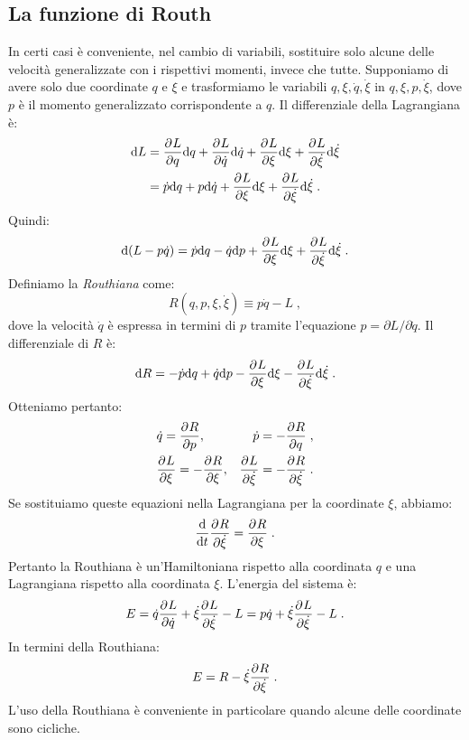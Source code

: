 \subsection{La funzione di Routh}
In certi casi è conveniente, nel cambio di variabili, sostituire solo alcune delle velocità generalizzate con i rispettivi momenti, invece che tutte. Supponiamo di avere solo due coordinate $q$ e $\xi$ e trasformiamo le variabili $q,\xi,\dot{q},\dot{\xi}$ in $q,\xi,p,\dot{\xi}$, dove $p$ è il momento generalizzato corrispondente a $q$. Il differenziale della Lagrangiana è:
\begin{align}
\mathrm{d}{L} &= \frac{\partial^{}L}{\partial q^{}}\mathrm{d}{q}+\frac{\partial^{}L}{\partial \dot{q}^{}}\mathrm{d}{\dot{q}}+\frac{\partial^{}L}{\partial \xi^{}}\mathrm{d}{\xi}+\frac{\partial^{}L}{\partial \dot{\xi}^{}}\mathrm{d}{\dot{\xi}} \notag \\
&=\dot{p}\mathrm{d}{q}+p\mathrm{d}{\dot{q}}+\frac{\partial^{}L}{\partial \xi^{}}\mathrm{d}{\xi}+\frac{\partial^{}L}{\partial \dot{\xi}^{}}\mathrm{d}{\dot{\xi}}\;.
\end{align}
Quindi:
\begin{equation}
\mathrm{d}{(L-p\dot{q})}=\dot{p}\mathrm{d}{q}-\dot{q}\mathrm{d}{p}+\frac{\partial^{}L}{\partial \xi^{}}\mathrm{d}{\xi}+\frac{\partial^{}L}{\partial \dot{\xi}^{}}\mathrm{d}{\dot{\xi}}\;.
\end{equation}
Definiamo la \emph{Routhiana} come:
\begin{equation}
R(q,p,\xi,\dot{\xi})\equiv p\dot{q}-L\;,
\end{equation}
dove la velocità $\dot{q}$ è espressa in termini di $p$ tramite l'equazione $p=\partial L/\partial\dot{q}$. Il differenziale di $R$ è:
\begin{equation}
\mathrm{d}{R}=-\dot{p}\mathrm{d}{q}+\dot{q}\mathrm{d}{p}-\frac{\partial^{}L}{\partial \xi^{}}\mathrm{d}{\xi}-\frac{\partial^{}L}{\partial \dot{\xi}^{}}\mathrm{d}{\dot{\xi}}\;.
\end{equation}
Otteniamo pertanto:
\begin{align}
&\dot{q}=\frac{\partial^{}R}{\partial p^{}}, &\dot{p}=-\frac{\partial^{}R}{\partial q^{}}\;, \\
&\frac{\partial^{}L}{\partial \xi^{}} =-\frac{\partial^{}R}{\partial \xi^{}}, &\frac{\partial^{}L}{\partial \dot{\xi}^{}}=-\frac{\partial^{}R}{\partial \dot{\xi}^{}}\;.
\end{align}
Se sostituiamo queste equazioni nella Lagrangiana per la coordinate $\xi$, abbiamo:
\begin{equation}
\frac{\mathrm{d}}{\mathrm{d}{t}}\frac{\partial^{}R}{\partial \dot{\xi}^{}}=\frac{\partial^{}R}{\partial \xi^{}}\;.
\end{equation}
Pertanto la Routhiana è un'Hamiltoniana rispetto alla coordinata $q$ e una Lagrangiana rispetto alla coordinata $\xi$. L'energia del sistema è:
\begin{equation}
E=\dot{q}\frac{\partial^{}L}{\partial \dot{q}^{}}+\dot{\xi}\frac{\partial^{}L}{\partial \dot{\xi}^{}}-L=p\dot{q}+\dot{\xi}\frac{\partial^{}L}{\partial \dot{\xi}^{}}-L\;.
\end{equation}
In termini della Routhiana:
\begin{equation}
E=R-\dot{\xi}\frac{\partial^{}R}{\partial \dot{\xi}^{}}\;.
\end{equation}
L'uso della Routhiana è conveniente in particolare quando alcune delle coordinate sono cicliche.
